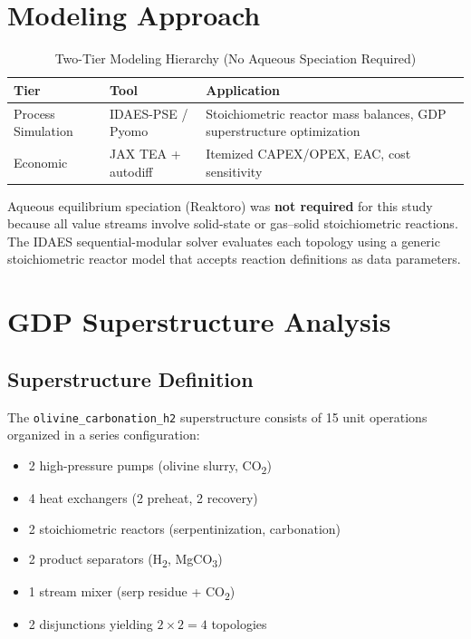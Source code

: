 \documentclass[11pt,a4paper]{article}
\begin{document}
\section{Modeling Approach}

\begin{table}[H]
\centering
\caption{Two-Tier Modeling Hierarchy (No Aqueous Speciation Required)}
\label{tab:modeling}
\begin{tabular}{p{3cm}p{4cm}p{5cm}}
\toprule
\textbf{Tier} & \textbf{Tool} & \textbf{Application} \\
\midrule
Process Simulation & IDAES-PSE / Pyomo & Stoichiometric reactor mass balances, GDP superstructure optimization \\
Economic & JAX TEA + autodiff & Itemized CAPEX/OPEX, EAC, cost sensitivity \\
\bottomrule
\end{tabular}
\end{table}

Aqueous equilibrium speciation (Reaktoro) was \textbf{not required} for this study because all value streams involve solid-state or gas--solid stoichiometric reactions.
The IDAES sequential-modular solver evaluates each topology using a generic stoichiometric reactor model that accepts reaction definitions as data parameters.

\section{GDP Superstructure Analysis}

\subsection{Superstructure Definition}

The \texttt{olivine\_carbonation\_h2} superstructure consists of 15 unit operations organized in a series configuration:

\begin{itemize}[noitemsep]
  \item 2 high-pressure pumps (olivine slurry, CO\textsubscript{2})
  \item 4 heat exchangers (2 preheat, 2 recovery)
  \item 2 stoichiometric reactors (serpentinization, carbonation)
  \item 2 product separators (H\textsubscript{2}, MgCO\textsubscript{3})
  \item 1 stream mixer (serp residue + CO\textsubscript{2})
  \item 2 disjunctions yielding $2 \times 2 = 4$ topologies
\end{itemize}
\end{document}
